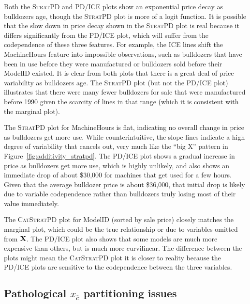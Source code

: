 \documentclass[12pt]{article}
\newcommand{\figref}[1]{Figure~\ref{#1}}
\newcommand{\spd}{\fontfamily{cmr}\textsc{\small StratPD}}
\newcommand{\cspd}{\fontfamily{cmr}\textsc{\small CatStratPD}}
\newcommand{\xnc}{$x_{\overline{c}}$}
\begin{document}
Both the \spd{} and PD/ICE plots show an exponential price decay as bulldozers age, though the \spd{} plot is more of a logit function. It is possible that the slow down in price decay shown in the \spd{} plot is real because it differs significantly from the PD/ICE plot, which will suffer from the codependence of these three features. For example, the ICE lines shift the MachineHours feature into impossible observations, such as bulldozers that have been in use before they were manufactured or bulldozers sold before their ModelID existed. It is clear from both plots that there is a great deal of price variability as bulldozers age.   The \spd{} plot (but not the PD/ICE plot) illustrates that there were many fewer bulldozers for sale that were manufactured before 1990 given the scarcity of lines in that range (which it is consistent with the marginal plot).

The \spd{} plot for MachineHours is flat, indicating no overall change in price as bulldozers get more use.  While counterintuitive, the slope lines indicate a high degree of variability that cancels out, very much like the ``big X'' pattern in \figref{fig:additivity_stratpd}. The PD/ICE plot shows a gradual increase in price as bulldozers get more use, which is highly unlikely, and also shows an immediate drop of about \$30,000 for machines that get used for a few hours. Given that the average bulldozer price is about \$36,000, that initial drop is likely due to variable codependence rather than bulldozers truly losing most of their value immediately.

The \cspd{} plot for ModelID (sorted by sale price) closely matches the marginal plot, which could be the true relationship or due to variables omitted from $\bf X$. The PD/ICE plot also shows that some models are much more expensive than others, but is much more curvilinear. The difference between the plots might mean the \cspd{} plot it is closer to reality because the PD/ICE plots are sensitive to the codependence between the three variables.

\subsection{Pathological \xnc{} partitioning issues}
\end{document}
